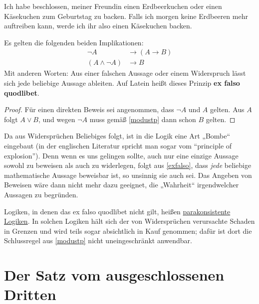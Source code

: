 \begin{bsp}
    Ich habe beschlossen, meiner Freundin einen Erdbeerkuchen oder einen Käsekuchen zum Geburtstag zu backen. Falls ich morgen keine Erdbeeren mehr auftreiben kann, werde ich ihr also einen Käsekuchen backen.
\end{bsp}


\begin{satz} \label{exfalso} 
    Es gelten die folgenden beiden Implikationen:
    \begin{align*}
        \neg A & \to (A\to B) \\
        (A\land \neg A) & \to B
    \end{align*}
    Mit anderen Worten: Aus einer falschen Aussage oder einem Widerspruch lässt sich jede beliebige Aussage ableiten. Auf Latein heißt dieses Prinzip \textbf{ex falso quodlibet}.
\end{satz}
\begin{proof}
    Für einen direkten Beweis sei angenommen, dass $\neg A$ und $A$ gelten. Aus $A$ folgt $A\lor B$, und wegen $\neg A$ muss gemäß \cref{modustp} dann schon $B$ gelten.
\end{proof}


\begin{vorschau} \label{explosion}
    Da aus Widersprüchen Beliebiges folgt, ist in die Logik eine Art „Bombe“ eingebaut (in der englischen Literatur spricht man sogar vom ``principle of explosion''). Denn wenn es uns gelingen sollte, auch nur eine einzige Aussage sowohl zu beweisen als auch zu widerlegen, folgt aus \cref{exfalso}, dass \emph{jede} beliebige mathematische Aussage beweisbar ist, so unsinnig sie auch sei. Das Angeben von Beweisen wäre dann nicht mehr dazu geeignet, die „Wahrheit“ irgendwelcher Aussagen zu begründen.
    
    Logiken, in denen das ex falso quodlibet nicht gilt, heißen \href{https://ncatlab.org/nlab/show/paraconsistent+logic}{parakonsistente Logiken}. In solchen Logiken hält sich der von Widersprüchen verursachte Schaden in Grenzen und wird teils sogar absichtlich in Kauf genommen; dafür ist dort die Schlussregel aus \cref{modustp} nicht uneingeschränkt anwendbar.
\end{vorschau}





\section{Der Satz vom ausgeschlossenen Dritten}


